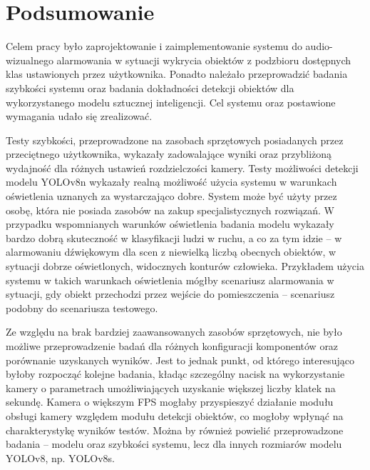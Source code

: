 \chapter{Podsumowanie}
\label{chap:podsumowanie}
Celem pracy było zaprojektowanie i zaimplementowanie systemu do audio-wizualnego alarmowania w sytuacji wykrycia obiektów z podzbioru dostępnych klas ustawionych przez użytkownika. Ponadto należało przeprowadzić badania szybkości systemu oraz badania dokładności detekcji obiektów dla wykorzystanego modelu sztucznej inteligencji.
Cel systemu oraz postawione wymagania udało się zrealizować.


Testy szybkości, przeprowadzone na zasobach sprzętowych posiadanych przez przeciętnego użytkownika, wykazały zadowalające wyniki oraz przybliżoną wydajność dla różnych ustawień rozdzielczości kamery. Testy możliwości detekcji modelu YOLOv8n wykazały realną możliwość użycia systemu w warunkach oświetlenia uznanych za wystarczająco dobre. System może być użyty przez osobę, która nie posiada zasobów na zakup specjalistycznych rozwiązań.
W przypadku wspomnianych warunków oświetlenia badania modelu wykazały bardzo dobrą skuteczność w klasyfikacji ludzi w ruchu, a co za tym idzie -- w alarmowaniu dźwiękowym dla scen z niewielką liczbą obecnych obiektów, w sytuacji dobrze oświetlonych, widocznych konturów człowieka. Przykładem użycia systemu w takich warunkach oświetlenia mógłby scenariusz alarmowania w sytuacji, gdy obiekt przechodzi przez wejście do pomieszczenia -- scenariusz podobny do scenariusza testowego.  


Ze względu na brak bardziej zaawansowanych zasobów sprzętowych, nie było możliwe przeprowadzenie badań dla różnych konfiguracji komponentów oraz porównanie uzyskanych wyników. Jest to jednak punkt, od którego interesująco byłoby rozpocząć kolejne badania, kładąc szczególny nacisk na wykorzystanie kamery o parametrach umożliwiających uzyskanie większej liczby klatek na sekundę.
Kamera o większym FPS mogłaby przyspieszyć działanie modułu obsługi kamery względem modułu detekcji obiektów, co mogłoby wpłynąć na charakterystykę wyników testów. Można by również powielić przeprowadzone badania -- modelu oraz szybkości systemu, lecz dla innych rozmiarów modelu YOLOv8, np. YOLOv8s.


